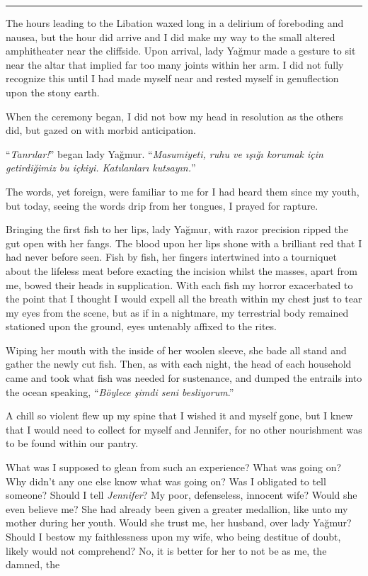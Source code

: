 \documentclass[11pt]{memoir}
\begin{document}
\noindent\rule{\textwidth}{1pt}

The hours leading to the Libation waxed long in a delirium of foreboding and nausea, but the hour did arrive and I did make my way to the small altered amphitheater near the cliffside. Upon arrival, lady Yağmur made a gesture to sit near the altar that implied far too many joints within her arm. I did not fully recognize this until I had made myself near and rested myself in genuflection upon the stony earth.

When the ceremony began, I did not bow my head in resolution as the others did, but gazed on with morbid anticipation.

``\textit{Tanrılar!}'' began lady Yağmur. ``\textit{Masumiyeti, ruhu ve ışığı korumak için getirdiğimiz bu içkiyi. Katılanları kutsayın.}''

The words, yet foreign, were familiar to me for I had heard them since my youth, but today, seeing the words drip from her tongues, I prayed for rapture.

Bringing the first fish to her lips, lady Yağmur, with razor precision ripped the gut open with her fangs. The blood upon her lips shone with a brilliant red that I had never before seen. Fish by fish, her fingers intertwined into a tourniquet about the lifeless meat before exacting the incision whilst the masses, apart from me, bowed their heads in supplication. With each fish my horror exacerbated to the point that I thought I would expell all the breath within my chest just to tear my eyes from the scene, but as if in a nightmare, my terrestrial body remained stationed upon the ground, eyes untenably affixed to the rites.

Wiping her mouth with the inside of her woolen sleeve, she bade all stand and gather the newly cut fish. Then, as with each night, the head of each household came and took what fish was needed for sustenance, and dumped the entrails into the ocean speaking, ``\textit{Böylece şimdi seni besliyorum}.'' %

A chill so violent flew up my spine that I wished it and myself gone, but I knew that I would need to collect for myself and Jennifer, for no other nourishment was to be found within our pantry.

What was I supposed to glean from such an experience? What was going on? Why didn't any one else know what was going on? Was I obligated to tell someone? Should I tell \textit{Jennifer}? My poor, defenseless, innocent wife? Would she even believe me? She had already been given a greater medallion, like unto my mother during her youth. Would she trust me, her husband, over lady Yağmur? Should I bestow my faithlessness upon my wife, who being destitue of doubt, likely would not comprehend? No, it is better for her to not be as me, the damned, the
\end{document}
